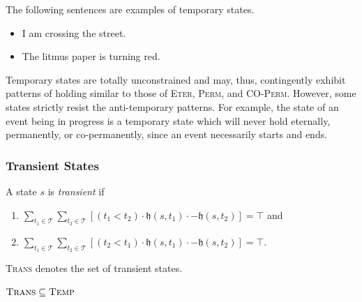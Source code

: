 The following sentences are examples of temporary states.

\begin{itemize}
  \item I am crossing the street.
  \item The litmus paper is turning red.
\end{itemize}

Temporary states are totally unconstrained and may, thus,
contingently exhibit patterns of holding similar to those of \textsc{Eter}, \textsc{Perm}, and \textsc{CO-Perm}. However, some states strictly
resist the anti-temporary patterns. For example, the state of
an event being in progress is a temporary state which will
never hold eternally, permanently, or co-permanently, since
an event necessarily starts and ends.

\subsubsection{Transient States}

\begin{defn}
  A state $s$ is \textit{transient} if
  \begin{enumerate}
    \item $\displaystyle \sum_{t_1 \in \mathcal{T}} \sum_{t_2 \in \mathcal{T}} [(t_1 < t_2) \cdot \mathfrak{h}(s, t_1) \cdot - \mathfrak{h}(s, t_2)] = \top$ and
    \item $\displaystyle \sum_{t_1 \in \mathcal{T}} \sum_{t_2 \in \mathcal{T}} [(t_2 < t_1) \cdot \mathfrak{h}(s, t_1) \cdot - \mathfrak{h}(s, t_2)] = \top$.
  \end{enumerate}
\end{defn}

\textsc{Trans} denotes the set of transient states.


$\textsc{Trans} \subseteq \textsc{Temp}$




